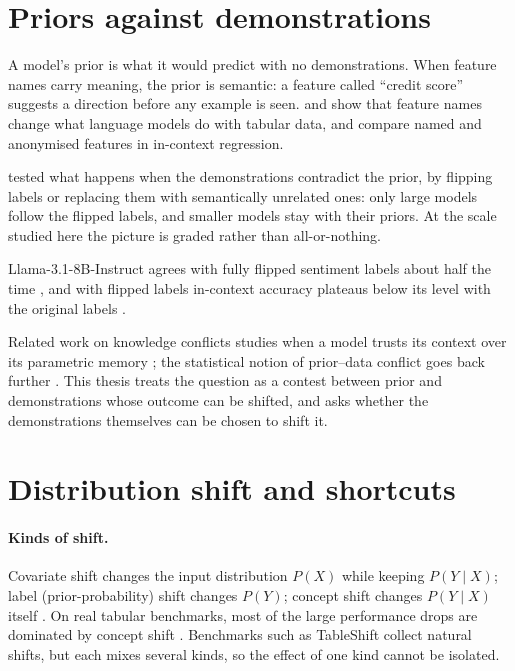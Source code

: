 \section{Priors against demonstrations}
\label{sec:bg-priors}

A model's prior is what it would predict with no demonstrations.
When feature names carry meaning, the prior is semantic: a feature called ``credit score'' suggests a direction before any example is seen.
\citet{dinh2022lift} and \citet{choi2022lmpriors} show that feature names change what language models do with tabular data, and \citet{nafar2025learning} compare named and anonymised features in in-context regression.

\citet{wei2023larger} tested what happens when the demonstrations contradict the prior, by flipping labels or replacing them with semantically unrelated ones: only large models follow the flipped labels, and smaller models stay with their priors.
At the scale studied here the picture is graded rather than all-or-nothing.

Llama-3.1-8B-Instruct agrees with fully flipped sentiment labels about half the time \citep{krishnakumar2025semantic}, and with flipped labels in-context accuracy plateaus below its level with the original labels \citep{kossen2024incontext}.

Related work on knowledge conflicts studies when a model trusts its context over its parametric memory \citep{longpre2021entity,xie2024adaptive}; the statistical notion of prior--data conflict goes back further \citep{evans2006checking}.
This thesis treats the question as a contest between prior and demonstrations whose outcome can be shifted, and asks whether the demonstrations themselves can be chosen to shift it.

\section{Distribution shift and shortcuts}
\label{sec:bg-shift}

\paragraph{Kinds of shift.}
Covariate shift changes the input distribution $P(X)$ while keeping $P(Y \mid X)$; label (prior-probability) shift changes $P(Y)$; concept shift changes $P(Y \mid X)$ itself \citep{shimodaira2000improving,quinonero2009dataset,morenotorres2012unifying}.
On real tabular benchmarks, most of the large performance drops are dominated by concept shift \citep{liu2023need}.
Benchmarks such as TableShift \citep{gardner2023tableshift} collect natural shifts, but each mixes several kinds, so the effect of one kind cannot be isolated.

